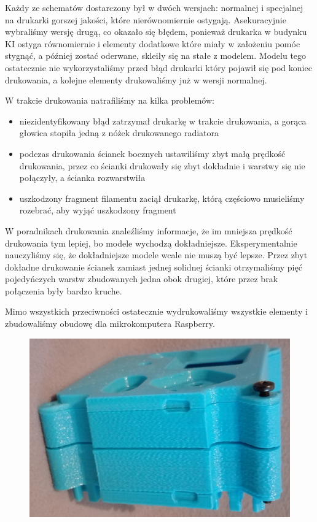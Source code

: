 Każdy ze schematów dostarczony był w dwóch wersjach: normalnej i specjalnej na drukarki
gorszej jakości, które nierównomiernie ostygają. Asekuracyjnie wybraliśmy wersję drugą,
co okazało się błędem, ponieważ drukarka w budynku KI ostyga równomiernie i elementy
dodatkowe które miały w założeniu pomóc stygnąć, a później zostać oderwane, skleiły
się na stałe z modelem. Modelu tego ostatecznie nie wykorzystaliśmy przed błąd drukarki
który pojawił się pod koniec drukowania, a kolejne elementy drukowaliśmy już w wersji normalnej.

W trakcie drukowania natrafiliśmy na kilka problemów:
\begin{itemize}
    \item niezidentyfikowany błąd zatrzymał drukarkę w trakcie drukowania, a gorąca głowica
    stopiła jedną z nóżek drukowanego radiatora
    \item podczas drukowania ścianek bocznych ustawiliśmy zbyt małą prędkość drukowania,
    przez co ścianki drukowały się zbyt dokładnie i warstwy się nie połączyły, a ścianka
    rozwarstwiła
    \item uszkodzony fragment filamentu zaciął drukarkę, którą częściowo musieliśmy rozebrać,
    aby wyjąć uszkodzony fragment
\end{itemize}

W poradnikach drukowania znaleźliśmy informacje, że im mniejsza prędkość drukowania tym lepiej,
bo modele wychodzą dokładniejsze. Eksperymentalnie nauczyliśmy się, że dokładniejsze modele wcale
nie muszą być lepsze. Przez zbyt dokładne drukowanie ścianek zamiast jednej solidnej ścianki otrzymaliśmy
pięć pojedyńczych warstw zbudowanych jedna obok drugiej, które przez brak połączenia były bardzo kruche.

Mimo wszystkich przeciwności ostatecznie wydrukowaliśmy wszystkie elementy i zbudowaliśmy obudowę dla
mikrokomputera Raspberry.

\begin{figure}[H]
    \centering
    \includegraphics[width=0.6\linewidth]{photos/all.png}
\end{figure}

